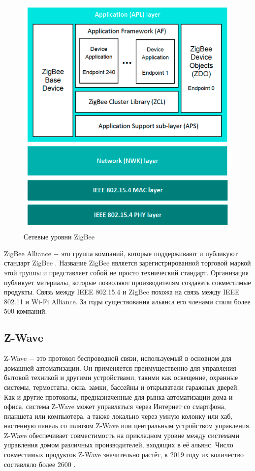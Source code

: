 	\begin{figure}[H]
		\centering
		\includegraphics[scale=0.6]{resources/ZigBee-network-layers}
		\caption{Сетевые уровни ZigBee}
		\label{fig1.2}
	\end{figure}

	ZigBee Alliance $-$ это группа компаний, которые поддерживают и публикуют стандарт ZigBee
	 \cite{zigbee-alliance}. Название 
	ZigBee является зарегистрированной торговой маркой этой группы и представляет собой не просто 
	технический стандарт. Организация публикует материалы, которые позволяют производителям 
	создавать совместимые продукты. Связь между IEEE 802.15.4 и ZigBee похожа на связь между 
	IEEE 802.11 и Wi-Fi Alliance. За годы существования альянса его членами стали более 500 компаний.
	
	
	\subsection{Z-Wave}
	Z-Wave $-$ это протокол беспроводной связи, используемый в основном для домашней автоматизации. 
	Он применяется преимущественно для управления бытовой техникой и другими устройствами, такими 
	как освещение, охранные системы, термостаты, окна, замки, бассейны и открыватели гаражных дверей.
	Как и другие протоколы, предназначенные для рынка автоматизации дома и офиса, система Z-Wave может 
	управляться через Интернет со смартфона, планшета или компьютера, а также локально через умную 
	колонку или хаб, настенную панель со шлюзом Z-Wave или центральным устройством управления. 
	Z-Wave обеспечивает совместимость на прикладном уровне между системами управления домом различных 
	производителей, входящих в её альянс. Число совместимых продуктов Z-Wave значительно растёт, 
	к 2019 году их количество составляло более 2600 \cite{z-wave-certified-products}.
	
